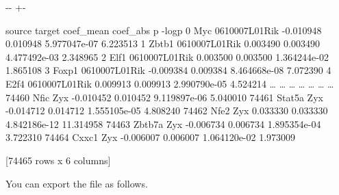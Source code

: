 \documentclass[letterpaper,10pt,english]{sphinxmanual}
\newlength\nbsphinxcodecellspacing
\begin{document}
{

\kern-\sphinxverbatimsmallskipamount\kern-\baselineskip
\kern+\FrameHeightAdjust\kern-\fboxrule
\vspace{\nbsphinxcodecellspacing}

\begin{sphinxVerbatim}[commandchars=\\\{\}]
\llap{\color{nbsphinxout}[24]:\,\hspace{\fboxrule}\hspace{\fboxsep}}       source         target  coef\_mean  coef\_abs             p      -logp
0         Myc  0610007L01Rik  -0.010948  0.010948  5.977047e-07   6.223513
1       Zbtb1  0610007L01Rik   0.003490  0.003490  4.477492e-03   2.348965
2        Elf1  0610007L01Rik   0.003500  0.003500  1.364244e-02   1.865108
3       Foxp1  0610007L01Rik  -0.009384  0.009384  8.464668e-08   7.072390
4        E2f4  0610007L01Rik   0.009913  0.009913  2.990790e-05   4.524214
{\ldots}       {\ldots}            {\ldots}        {\ldots}       {\ldots}           {\ldots}        {\ldots}
74460    Nfic            Zyx  -0.010452  0.010452  9.119897e-06   5.040010
74461  Stat5a            Zyx  -0.014712  0.014712  1.555105e-05   4.808240
74462    Nfe2            Zyx   0.033330  0.033330  4.842186e-12  11.314958
74463  Zbtb7a            Zyx  -0.006734  0.006734  1.895354e-04   3.722310
74464   Cxxc1            Zyx  -0.006007  0.006007  1.064120e-02   1.973009

[74465 rows x 6 columns]
\end{sphinxVerbatim}
}

You can export the file as follows.

{
\begin{sphinxVerbatim}[commandchars=\\\{\}]
\llap{\color{nbsphinxin}[ ]:\,\hspace{\fboxrule}\hspace{\fboxsep}}
  

\PYG{p}{[}\PYG{p}{]}
\end{sphinxVerbatim}
}
\end{document}
